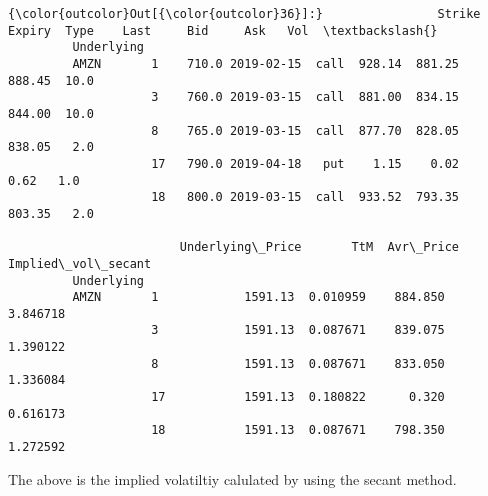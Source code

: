 \documentclass[11pt]{article}
\begin{document}
\begin{Verbatim}[commandchars=\\\{\}]
{\color{outcolor}Out[{\color{outcolor}36}]:}                Strike     Expiry  Type    Last     Bid     Ask   Vol  \textbackslash{}
         Underlying                                                             
         AMZN       1    710.0 2019-02-15  call  928.14  881.25  888.45  10.0   
                    3    760.0 2019-03-15  call  881.00  834.15  844.00  10.0   
                    8    765.0 2019-03-15  call  877.70  828.05  838.05   2.0   
                    17   790.0 2019-04-18   put    1.15    0.02    0.62   1.0   
                    18   800.0 2019-03-15  call  933.52  793.35  803.35   2.0   
         
                        Underlying\_Price       TtM  Avr\_Price  Implied\_vol\_secant  
         Underlying                                                                
         AMZN       1            1591.13  0.010959    884.850            3.846718  
                    3            1591.13  0.087671    839.075            1.390122  
                    8            1591.13  0.087671    833.050            1.336084  
                    17           1591.13  0.180822      0.320            0.616173  
                    18           1591.13  0.087671    798.350            1.272592  
\end{Verbatim}
            
    The above is the implied volatiltiy calulated by using the secant
method.
\end{document}
